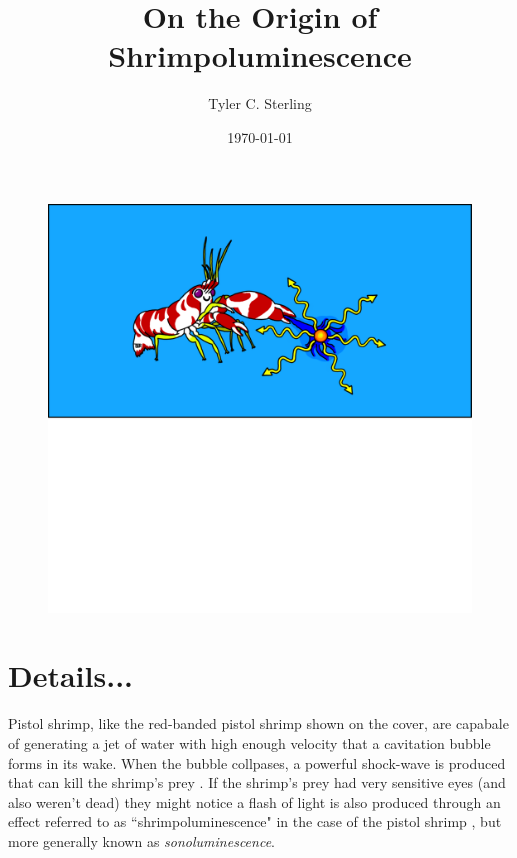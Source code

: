 \documentclass[prl,aps,11pt,superscriptaddress,floatfix]{revtex4-2}
\begin{document}
\title{\huge On the Origin of Shrimpoluminescence }

\author{\large Tyler C. Sterling}

\date{\today}


\maketitle



\begin{figure}
\includegraphics[width=1\linewidth]{../figs/shrimpy2.pdf}
\label{fig:shrimpy}
\end{figure}
 
\newpage

\section{Details...}
Pistol shrimp, like the red-banded pistol shrimp shown on the cover, are capabale of generating a jet of water with high enough velocity that a cavitation bubble forms in its wake. When the bubble collpases, a powerful shock-wave is produced that can kill the shrimp's prey \cite{versluis2000snapping}. If the shrimp's prey had very sensitive eyes (and also weren't dead) they might notice a flash of light is also produced through an effect referred to as ``shrimpoluminescence" in the case of the pistol shrimp \cite{lohse2001snapping}, but more generally known as \emph{sonoluminescence}.
\end{document}
